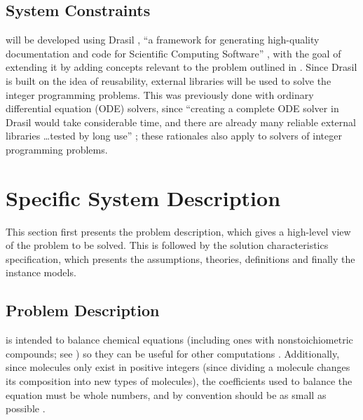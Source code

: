 \documentclass[12pt]{article}
\begin{document}
\subsection{System Constraints} \label{sec_sysConst}


\progname{} will be developed using Drasil \cite{carette_drasil_2021}, ``a
framework for generating high-quality documentation and code for Scientific
Computing Software'' \cite[p.~iii]{maclachlan_design_2020}, with the goal of
extending it by adding concepts relevant to the problem outlined in
.
Since Drasil is built on the idea of reusability, external libraries will be
used to solve the integer programming problems. This was previously done with
ordinary differential equation (ODE) solvers, since ``creating a complete ODE
solver in Drasil would take considerable time, and there are already many
reliable external libraries \dots tested by long use''
\cite[p.~24]{chen_solving_2022}; these rationales also apply to solvers of
integer programming problems.

\section{Specific System Description} \label{sec_specSysDesc}

This section first presents the problem description, which gives a high-level
view of the problem to be solved.  This is followed by the solution characteristics
specification, which presents the assumptions, theories, definitions and finally
the instance models.

\subsection{Problem Description} \label{sec_probDesc}

\progname{} is intended to balance chemical equations (including ones with
nonstoichiometric compounds; see ) so
they can be useful for other computations \cite{lund_introduction_2023}.
Additionally, since molecules only exist in positive integers (since dividing a
molecule changes its composition into new types of molecules), the coefficients
used to balance the equation must be whole
numbers, and by convention should be as small as possible
\cite{lund_introduction_2023}.
\end{document}
